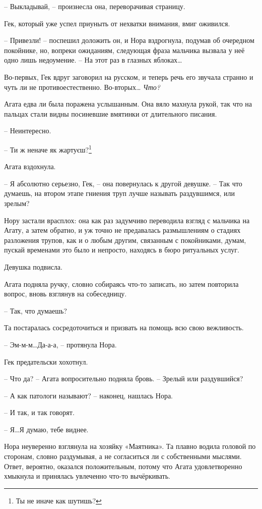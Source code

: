 \documentclass[
  a5paperpaper,
  DIV=11,
  numbers=noendperiod]{scrreprt}
\begin{document}
-- Выкладывай, -- произнесла она, переворачивая страницу.

Гек, который уже успел приуныть от нехватки внимания, вмиг оживился.

-- Привезли! -- поспешил доложить он, и Нора вздрогнула, подумав об
очередном покойнике, но, вопреки ожиданиям, следующая фраза мальчика
вызвала у неё одно лишь недоумение. -- На этот раз в глазных
яблоках\ldots{}

Во-первых, Гек вдруг заговорил на русском, и теперь речь его звучала
странно и чуть ли не противоестественно. Во-вторых\ldots{} \emph{Что?}

Агата едва ли была поражена услышанным. Она вяло махнула рукой, так что
на пальцах стали видны посиневшие вмятинки от длительного писания.

-- Неинтересно.

-- Ти ж неначе як жартуєш?\footnote{Ты не иначе как шутишь?}

Агата вздохнула.

-- Я абсолютно серьезно, Гек, -- она повернулась к другой девушке. --
Так что думаешь, на втором этапе гниения труп лучше называть
раздувшимся, или зрелым?

Нору застали врасплох: она как раз задумчиво переводила взгляд с
мальчика на Агату, а затем обратно, и уж точно не предавалась
размышлениям о стадиях разложения трупов, как и о любым другим,
связанным с покойниками, думам, пускай временами это было и непросто,
находясь в бюро ритуальных услуг.

Девушка подвисла.

Агата подняла ручку, словно собираясь что-то записать, но затем
повторила вопрос, вновь взглянув на собеседницу.

-- Так, что думаешь?

Та постаралась сосредоточиться и призвать на помощь всю свою вежливость.

-- Эм-м-м\ldots Да-а-а, -- протянула Нора.

Гек предательски хохотнул.

-- Что да? -- Агата вопросительно подняла бровь. -- Зрелый или
раздувшийся?

-- А как патологи называют? -- наконец, нашлась Нора.

-- И так, и так говорят.

-- Я\ldots Я думаю, тебе виднее.

Нора неуверенно взглянула на хозяйку «Маятника». Та плавно водила
головой по сторонам, словно раздумывая, а не согласиться ли с
собственными мыслями. Ответ, вероятно, оказался положительным, потому
что Агата удовлетворенно хмыкнула и принялась увлеченно что-то
вычёркивать.
\end{document}
